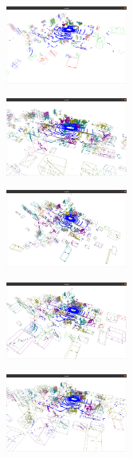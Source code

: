 \documentclass[10pt]{article}
\theoremstyle{nonumberplain}
\begin{document}
\begin{figure}[H]
	\centering
	\begin{minipage}[t]{0.3\textwidth}
		\centering
		\includegraphics[width=4cm]{fig4a.png}
		\label{fig4a}
	\end{minipage}
	\begin{minipage}[t]{0.3\textwidth}
		\centering
		\includegraphics[width=4cm]{fig4e.png}
		\label{fig4b}
	\end{minipage}
	\begin{minipage}[t]{0.3\textwidth}
		\centering
		\includegraphics[width=4cm]{fig4b.png}
		\label{fig4c}
	\end{minipage}
	\begin{minipage}[t]{0.3\textwidth}
		\centering
		\includegraphics[width=4cm]{fig4c.png}
		\label{fig4d}
	\end{minipage}
	\begin{minipage}[t]{0.3\textwidth}
		\centering
		\includegraphics[width=4cm]{fig4d.png}

\end{minipage}
\end{figure}
\end{document}
